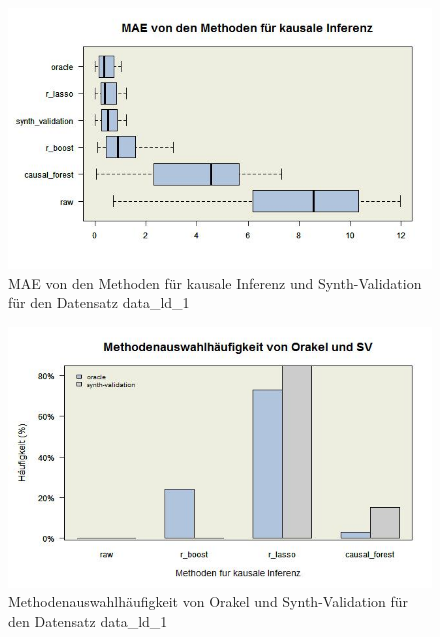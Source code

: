 \documentclass[12pt,a4paper,twoside]{scrartcl}
\numberwithin{equation}{section}
\newcounter{mypagecount}%
\newenvironment{interlude}{%
  \clearpage
  \setcounter{mypagecount}{\value{page}}%
  \thispagestyle{empty}%
  \pagestyle{empty}%
}{%
  \clearpage
  \setcounter{page}{\value{mypagecount}}%
}
\begin{document}
\begin{interlude}
\begin{appendices}
\begin{center}
\begin{figure}[H]
    \centering
    \includegraphics[height=0.5\textwidth, width=1\textwidth]{figures/plots/appendix/generatedDataLD1Boxplot.jpeg}
    \caption[MAE von den Methoden für kausale Inferenz und Synth-Validation für den Datensatz data\_ld\_1]{MAE von den Methoden für kausale Inferenz und Synth-Validation für den Datensatz data\_ld\_1}
  \end{figure}
\end{center}

\begin{center}
\begin{figure}[H]
    \centering
    \includegraphics[height=0.5\textwidth, width=1\textwidth]{figures/plots/appendix/generatedDataLD1Barplot.jpeg}
    \caption[Methodenauswahlhäufigkeit von Orakel und Synth-Validation für den Datensatz data\_ld\_1]{Methodenauswahlhäufigkeit von Orakel und Synth-Validation für den Datensatz data\_ld\_1}
  \end{figure}
\end{center}


\end{appendices}
\end{interlude}
\end{document}
